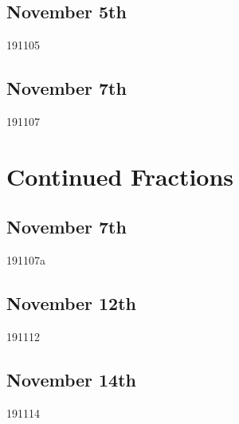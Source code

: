 \subsection{November 5th}
{191105}

\subsection{November 7th}
{191107}

\section{Continued Fractions}
\subsection{November 7th}
{191107a}

\subsection{November 12th}
{191112}

\subsection{November 14th}
{191114}


